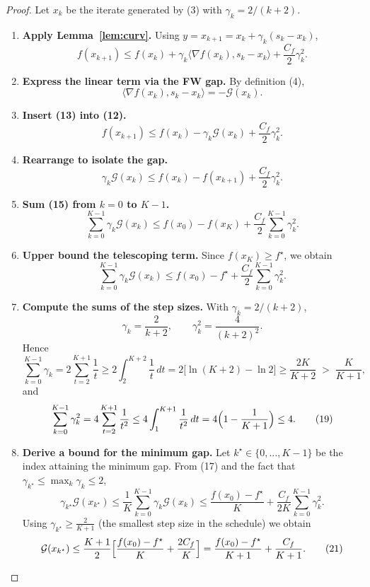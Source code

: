 \documentclass{article}
\newcommand{\gap}{\mathcal{G}}
\newcommand{\curv}{C_f}
\begin{document}
\begin{proof}
Let $x_k$ be the iterate generated by (3) with $\gamma_k=2/(k+2)$.
\begin{enumerate}[label=[Step \arabic*], leftmargin=*, align=left]
\item \textbf{Apply Lemma~\ref{lem:curv}.}
    Using $y = x_{k+1}=x_k+\gamma_k(s_k-x_k)$,
    \[
    f(x_{k+1})\le f(x_k)+\gamma_k\langle\nabla f(x_k),s_k-x_k\rangle
               +\frac{\curv}{2}\gamma_k^{2}.
    \tag{12}
    \]

\item \textbf{Express the linear term via the FW gap.}
    By definition (4),
    \[
    \langle\nabla f(x_k),s_k-x_k\rangle = -\gap(x_k).
    \tag{13}
    \]

\item \textbf{Insert (13) into (12).}
    \[
    f(x_{k+1})\le f(x_k)-\gamma_k\gap(x_k)+\frac{\curv}{2}\gamma_k^{2}.
    \tag{14}
    \]

\item \textbf{Rearrange to isolate the gap.}
    \[
    \gamma_k\gap(x_k)\le f(x_k)-f(x_{k+1})+\frac{\curv}{2}\gamma_k^{2}.
    \tag{15}
    \]

\item \textbf{Sum (15) from $k=0$ to $K-1$.}
    \[
    \sum_{k=0}^{K-1}\gamma_k\gap(x_k)
    \le f(x_0)-f(x_K)+\frac{\curv}{2}\sum_{k=0}^{K-1}\gamma_k^{2}.
    \tag{16}
    \]

\item \textbf{Upper bound the telescoping term.}
    Since $f(x_K)\ge f^\star$, we obtain
    \[
    \sum_{k=0}^{K-1}\gamma_k\gap(x_k)
    \le f(x_0)-f^\star+\frac{\curv}{2}\sum_{k=0}^{K-1}\gamma_k^{2}.
    \tag{17}
    \]

\item \textbf{Compute the sums of the step sizes.}
    With $\gamma_k=2/(k+2)$,
    \[
    \gamma_k = \frac{2}{k+2},\qquad
    \gamma_k^{2}= \frac{4}{(k+2)^{2}}.
    \]
    Hence
    \[
    \sum_{k=0}^{K-1}\gamma_k
    = 2\sum_{t=2}^{K+1}\frac{1}{t}
    \ge 2\int_{2}^{K+2}\frac{1}{t}\,dt
    = 2\bigl[\ln(K+2)-\ln 2\bigr]
    \ge \frac{2K}{K+2}\;>\;\frac{K}{K+1},
    \tag{18}
    \]
    and
    \[
    \sum_{k=0}^{K-1}\gamma_k^{2}
    = 4\sum_{t=2}^{K+1}\frac{1}{t^{2}}
    \le 4\int_{1}^{K+1}\frac{1}{t^{2}}\,dt
    = 4\Bigl(1-\frac{1}{K+1}\Bigr)
    \le 4 .
    \tag{19}
    \]

\item \textbf{Derive a bound for the minimum gap.}
    Let $k^\star\in\{0,\dots,K-1\}$ be the index attaining the minimum gap.
    From (17) and the fact that $\gamma_{k^\star}\le\max_k\gamma_k\le 2$,
    \[
    \gamma_{k^\star}\gap(x_{k^\star})
    \le \frac{1}{K}\sum_{k=0}^{K-1}\gamma_k\gap(x_k)
    \le \frac{f(x_0)-f^\star}{K}
       +\frac{\curv}{2K}\sum_{k=0}^{K-1}\gamma_k^{2}.
    \tag{20}
    \]
    Using $\gamma_{k^\star}\ge\frac{2}{K+1}$ (the smallest step size in the
    schedule) we obtain
    \[
    \gap(x_{k^\star})
    \le \frac{K+1}{2}\Bigl[\frac{f(x_0)-f^\star}{K}
          +\frac{2\curv}{K}\Bigr]
    = \frac{f(x_0)-f^\star}{K+1}
      +\frac{\curv}{K+1}.
    \tag{21}
    \]


\end{enumerate}
\end{proof}
\end{document}
